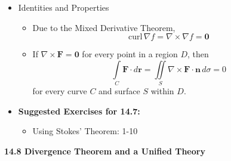 \documentclass[12pt]{article}
\theoremstyle{plain}
\theoremstyle{definition}
\theoremstyle{remark}
\newcommand{\vect}[1]{\mathbf{#1}}
\begin{document}
\begin{itemize}
	\item Identities and Properties
	
		\begin{itemize}
		\item Due to the Mixed Derivative Theorem, \[\textrm{curl}\, \nabla f = \nabla \times \nabla f = \vect{0}\]
		\item If $\nabla \times \vect{F} = \vect{0}$ for every point in a region $D$, then \[ \int\limits_C \vect{F}\cdot d\vect{r} = \iint\limits_S \nabla \times \vect{F} \cdot \vect{n}\,d\sigma = 0\] for every curve $C$ and surface $S$ within $D$.
		\end{itemize}
				
	\item \textbf{Suggested Exercises for 14.7:}
	
		\begin{itemize}
		\item Using Stokes' Theorem: 1-10
		\end{itemize}
		
	\end{itemize}
	
	\newpage
	
	\centerline{\bf 14.8 Divergence Theorem and a Unified Theory}
	
\end{document}
